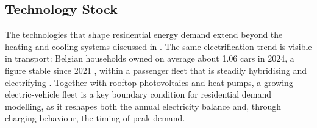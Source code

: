 \subsection{Technology Stock}
The technologies that shape residential energy demand extend beyond the heating
and cooling systems discussed in . The same
electrification trend is visible in transport: Belgian households owned on average
about 1.06 cars in 2024, a figure stable since 2021 \cite{StatbelHouseholds2025},
within a passenger fleet that is steadily hybridising and electrifying
\cite{Statbel2025EV}. Together with rooftop photovoltaics and heat pumps, a
growing electric-vehicle fleet is a key boundary condition for residential demand
modelling, as it reshapes both the annual electricity balance and, through
charging behaviour, the timing of peak demand.
